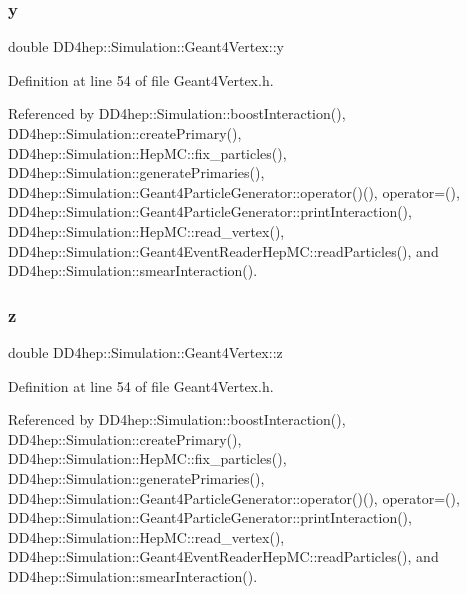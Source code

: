 \hypertarget{class_d_d4hep_1_1_simulation_1_1_geant4_vertex_afbb9e4460c4c7a1610b5d3d0ccb37e25}{}\label{class_d_d4hep_1_1_simulation_1_1_geant4_vertex_afbb9e4460c4c7a1610b5d3d0ccb37e25} 
\subsubsection{\texorpdfstring{y}{y}}
{\footnotesize\ttfamily double D\+D4hep\+::\+Simulation\+::\+Geant4\+Vertex\+::y}



Definition at line 54 of file Geant4\+Vertex.\+h.



Referenced by D\+D4hep\+::\+Simulation\+::boost\+Interaction(), D\+D4hep\+::\+Simulation\+::create\+Primary(), D\+D4hep\+::\+Simulation\+::\+Hep\+M\+C\+::fix\+\_\+particles(), D\+D4hep\+::\+Simulation\+::generate\+Primaries(), D\+D4hep\+::\+Simulation\+::\+Geant4\+Particle\+Generator\+::operator()(), operator=(), D\+D4hep\+::\+Simulation\+::\+Geant4\+Particle\+Generator\+::print\+Interaction(), D\+D4hep\+::\+Simulation\+::\+Hep\+M\+C\+::read\+\_\+vertex(), D\+D4hep\+::\+Simulation\+::\+Geant4\+Event\+Reader\+Hep\+M\+C\+::read\+Particles(), and D\+D4hep\+::\+Simulation\+::smear\+Interaction().

\hypertarget{class_d_d4hep_1_1_simulation_1_1_geant4_vertex_af2489a2b21e08b2cc0ffe1f4bf1937df}{}\label{class_d_d4hep_1_1_simulation_1_1_geant4_vertex_af2489a2b21e08b2cc0ffe1f4bf1937df} 
\subsubsection{\texorpdfstring{z}{z}}
{\footnotesize\ttfamily double D\+D4hep\+::\+Simulation\+::\+Geant4\+Vertex\+::z}



Definition at line 54 of file Geant4\+Vertex.\+h.



Referenced by D\+D4hep\+::\+Simulation\+::boost\+Interaction(), D\+D4hep\+::\+Simulation\+::create\+Primary(), D\+D4hep\+::\+Simulation\+::\+Hep\+M\+C\+::fix\+\_\+particles(), D\+D4hep\+::\+Simulation\+::generate\+Primaries(), D\+D4hep\+::\+Simulation\+::\+Geant4\+Particle\+Generator\+::operator()(), operator=(), D\+D4hep\+::\+Simulation\+::\+Geant4\+Particle\+Generator\+::print\+Interaction(), D\+D4hep\+::\+Simulation\+::\+Hep\+M\+C\+::read\+\_\+vertex(), D\+D4hep\+::\+Simulation\+::\+Geant4\+Event\+Reader\+Hep\+M\+C\+::read\+Particles(), and D\+D4hep\+::\+Simulation\+::smear\+Interaction().



